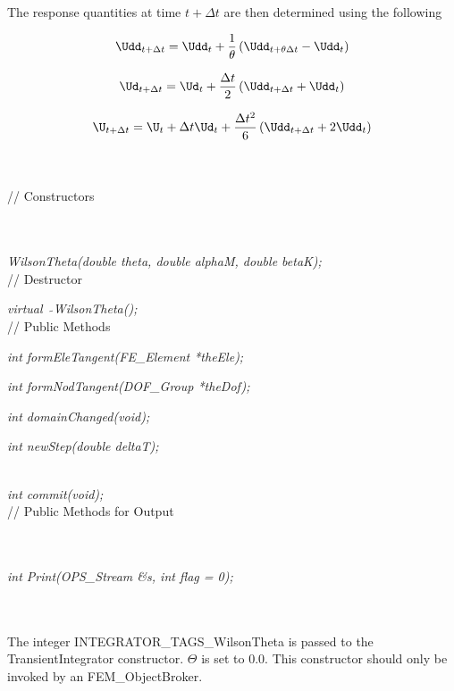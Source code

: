 \noindent The response quantities at time $t + \Delta t$ are then
determined using the following

$$
\Udd_{t + \Delta t} = \Udd_t + \frac{1}{\theta} \left( \Udd_{t +
\theta \Delta t} - \Udd_t \right)
$$


$$ \Ud_{t + \Delta t} = \Ud_t + \frac{\Delta t}{2}\left( \Udd_{t +
\Delta t} + \Udd_t \right) $$


$$ \U_{t + \Delta t} = \U_t + \Delta t\Ud_t + \frac{\Delta t^2}{6}\left(
\Udd_{t + \Delta t} + 2 \Udd_t \right) $$

\\

\pagebreak
{} \\
// Constructors 

\\ 
\\ 
{\em WilsonTheta(double theta, double alphaM, double betaK);}\\ 

// Destructor 

{\em virtual~ $\tilde{}$WilsonTheta();}\\ 

// Public Methods 

{\em int formEleTangent(FE\_Element *theEle);} 

{\em int formNodTangent(DOF\_Group *theDof);} 

{\em int domainChanged(void);}

{\em int newStep(double deltaT);}

 \\ 
{\em int commit(void);}\\ 

// Public Methods for Output

\\ 
\\ 
{\em int Print(OPS_Stream \&s, int flag = 0);}


 \\
\\ 
The integer INTEGRATOR\_TAGS\_WilsonTheta is passed to the TransientIntegrator
constructor. $\Theta$ is set to 0.0. This constructor should only be
invoked by an FEM\_ObjectBroker. \\



